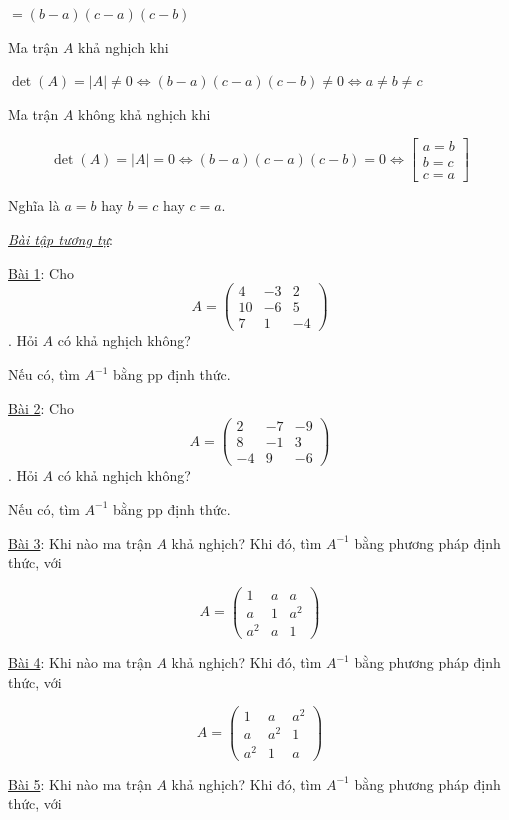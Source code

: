 \documentclass[
]{article}
\let\ul\uline
\begin{document}
$= (b-a)(c-a)(c-b)$

Ma trận $A$ khả
nghịch khi

$\det(A) = |A| \neq 0 \Leftrightarrow (b-a)(c-a)(c-b) \neq 0 \Leftrightarrow a \neq b \neq c$

Ma trận $A$ không
khả nghịch khi

$$\det(A) = |A| = 0 \Leftrightarrow (b-a)(c-a)(c-b) = 0 \Leftrightarrow \begin{bmatrix} a = b \\ b = c \\ c = a \end{bmatrix}$$

Nghĩa là $a=b$ hay
$b=c$ hay
$c=a$.

\emph{\ul{Bài tập tương tự}}:

\ul{Bài 1}: Cho
$$A = \begin{pmatrix} 4 & -3 & 2 \\ 10 & -6 & 5 \\ 7 & 1 & -4 \end{pmatrix}$$. Hỏi
$A$ có khả nghịch
không?

Nếu có, tìm $A^{-1}$
bằng pp định thức.

\ul{Bài 2}: Cho
$$A = \begin{pmatrix} 2 & -7 & -9 \\ 8 & -1 & 3 \\ -4 & 9 & -6 \end{pmatrix}$$. Hỏi
$A$ có khả nghịch
không?

Nếu có, tìm $A^{-1}$
bằng pp định thức.

\ul{Bài 3}: Khi nào ma trận
$A$ khả nghịch?
Khi đó, tìm $A^{-1}$
bằng phương pháp định thức, với

$$A = \begin{pmatrix} 1 & a & a \\ a & 1 & a^2 \\ a^2 & a & 1 \end{pmatrix}$$

\ul{Bài 4}: Khi nào ma trận
$A$ khả nghịch?
Khi đó, tìm $A^{-1}$
bằng phương pháp định thức, với

$$A = \begin{pmatrix} 1 & a & a^2 \\ a & a^2 & 1 \\ a^2 & 1 & a \end{pmatrix}$$

\ul{Bài 5}: Khi nào ma trận
$A$ khả nghịch?
Khi đó, tìm $A^{-1}$
bằng phương pháp định thức, với
\end{document}
